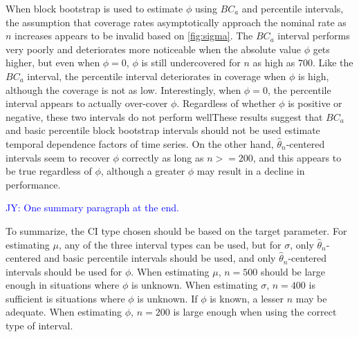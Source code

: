 \documentclass[12pt, letterpaper, titlepage]{article}
\newcommand{\jy}[1]{\textcolor{blue}{JY: #1}}
\begin{document}
When block bootstrap is used to estimate $\phi$ using $BC_a$ and percentile
intervals, the assumption that coverage rates asymptotically approach the
nominal rate as $n$ increases appears to be invalid based on \ref{fig:sigma}.
The $BC_a$ interval performs very poorly and deteriorates more noticeable
when the absolute value $\phi$ gets
higher, but even when $\phi = 0$, $\phi$ is still undercovered for $n$ as high
as $700$. Like the $BC_a$ interval, the percentile interval deteriorates in
coverage when $\phi$ is high, although the coverage is not as low.
Interestingly, when $\phi = 0$, the percentile interval appears to actually
over-cover $\phi$. Regardless of whether $\phi$ is positive or negative, these two 
intervals do not perform wellThese results suggest that $BC_a$ and basic percentile
block bootstrap intervals should not be used estimate temporal dependence
factors of time series. On the other hand, $\hat{\theta}_{n}$-centered
intervals seem to recover $\phi$ correctly as long as $n >= 200$, and this
appears to be true regardless of $\phi$, although a greater $\phi$ may result
in a decline in performance.

\jy{One summary paragraph at the end.}

To summarize, the CI type chosen should be based on the target parameter.
For estimating $\mu$, any of the three interval types can be used, but for
$\sigma$, only $\hat{\theta}_{n}$-centered and basic percentile intervals
should be used, and only $\hat{\theta}_{n}$-centered intervals should be used
for $\phi$. When estimating
$\mu$, $n = 500$ should be large enough in situations where $\phi$ is unknown.
When estimating $\sigma$, $n = 400$ is sufficient is situations where $\phi$ is
unknown. If $\phi$ is known, a lesser $n$ may be adequate. When estimating
$\phi$, $n = 200$ is large enough when using the correct type of interval.
\end{document}
